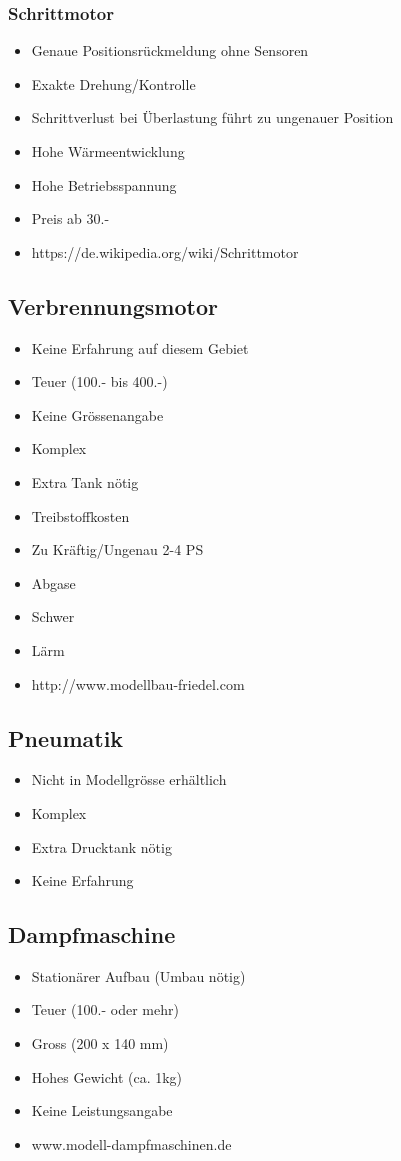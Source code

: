 \subsubsection{Schrittmotor}
\begin{itemize}
\item Genaue Positionsrückmeldung ohne Sensoren
\item Exakte Drehung/Kontrolle
\item Schrittverlust bei Überlastung führt zu ungenauer Position
\item Hohe Wärmeentwicklung
\item Hohe Betriebsspannung
\item Preis ab 30.-
\item https://de.wikipedia.org/wiki/Schrittmotor
\end{itemize}


\subsection{Verbrennungsmotor}
\begin{itemize}
\item Keine Erfahrung auf diesem Gebiet
\item Teuer (100.- bis 400.-)
\item Keine Grössenangabe
\item Komplex
\item Extra Tank nötig
\item Treibstoffkosten
\item Zu Kräftig/Ungenau 2-4 PS
\item Abgase
\item Schwer
\item Lärm
\item http://www.modellbau-friedel.com
\end{itemize}

\subsection{Pneumatik}
\begin{itemize}
\item Nicht in Modellgrösse erhältlich
\item Komplex
\item Extra Drucktank nötig
\item Keine Erfahrung
\end{itemize}

\subsection{Dampfmaschine}
\begin{itemize}
\item Stationärer Aufbau (Umbau nötig)
\item Teuer (100.- oder mehr)
\item Gross (200 x 140 mm)
\item Hohes Gewicht (ca. 1kg)
\item Keine Leistungsangabe
\item www.modell-dampfmaschinen.de
\end{itemize}
